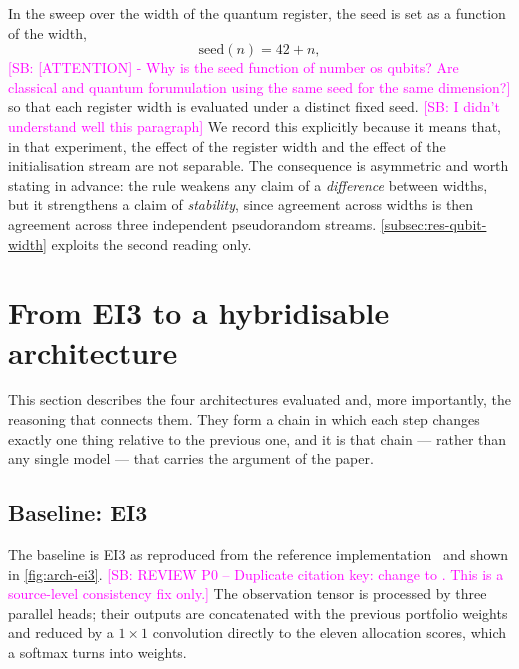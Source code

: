 \documentclass[aps,floatfix,superscriptaddress,twocolumn,tightenlines,amsmath,amssymb,nofootinbib,10pt,longbibliography,prl]{revtex4-2}
\newcommand{\sam}[1]{\textcolor{magenta}{[SB: {#1}]}}
\begin{document}
In the sweep over the width of the quantum register, the seed is set as a function of the width,
%
\begin{equation}
  \mathrm{seed}(n) = 42 + n,
  \label{eq:seed-rule}
\end{equation}
%
\sam{[ATTENTION] - Why is the seed function of number os qubits? Are classical and quantum forumulation using the same seed for the same dimension?}
so that each register width is evaluated under a distinct fixed seed. \sam{I didn't understand well this paragraph} We record this explicitly because it means that, in that experiment, the effect of the register width and the effect of the initialisation stream are not separable. The consequence is asymmetric and worth stating in advance: the rule weakens any claim of a \emph{difference} between widths, but it strengthens a claim of \emph{stability}, since agreement across widths is then agreement across three independent pseudorandom streams. \ref{subsec:res-qubit-width} exploits the second reading only.

\section{From EI3 to a hybridisable architecture}
\label{sec:architectures}

This section describes the four architectures evaluated and, more importantly, the reasoning that connects them. They form a chain in which each step changes exactly one thing relative to the previous one, and it is that chain --- rather than any single model --- that carries the argument of the paper.

\subsection{Baseline: EI3}
\label{subsec:arch-ei3}

The baseline is EI3 as reproduced from the reference implementation~\cite{RLportfolio,RLportfolio} and shown in \ref{fig:arch-ei3}.
\sam{REVIEW P0 -- Duplicate citation key: change \string\cite{RLportfolio,RLportfolio} to \string\cite{RLportfolio}. This is a source-level consistency fix only.} The observation tensor is processed by three parallel heads; their outputs are concatenated with the previous portfolio weights and reduced by a $1\times1$ convolution directly to the eleven allocation scores, which a softmax turns into weights.
\end{document}
